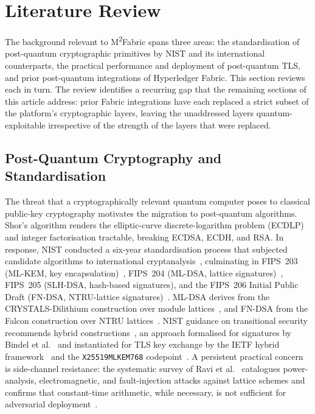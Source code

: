 \documentclass{ieeetj}
\newcommand{\mfabric}{M\textsuperscript{2}Fabric}
\begin{document}
\section{Literature Review} \label{sec:litreview}

The background relevant to \mfabric{} spans three areas: the standardisation
of post-quantum cryptographic primitives by NIST and its international
counterparts, the practical performance and deployment of post-quantum TLS,
and prior post-quantum integrations of Hyperledger Fabric. This section
reviews each in turn. The review identifies a recurring gap that the
remaining sections of this article address: prior Fabric integrations have
each replaced a strict subset of the platform's cryptographic layers,
leaving the unaddressed layers quantum-exploitable irrespective of the
strength of the layers that were replaced.

\subsection{Post-Quantum Cryptography and Standardisation}

The threat that a cryptographically relevant quantum computer poses to
classical public-key cryptography motivates the migration to post-quantum
algorithms. Shor's algorithm renders the elliptic-curve discrete-logarithm
problem (ECDLP) and integer factorisation tractable, breaking ECDSA, ECDH, and
RSA. In response, NIST conducted a six-year standardisation process that
subjected candidate algorithms to international
cryptanalysis~\cite{alagic2022nist}, culminating in FIPS~203 (ML-KEM, key
encapsulation)~\cite{nist_fips203}, FIPS~204 (ML-DSA, lattice
signatures)~\cite{nist_fips204}, FIPS~205 (SLH-DSA, hash-based signatures), and
the FIPS~206 Initial Public Draft (FN-DSA, NTRU-lattice
signatures)~\cite{nist_fips206}. ML-DSA derives from the CRYSTALS-Dilithium
construction over module lattices~\cite{ducas2018dilithium}, and FN-DSA from the
Falcon construction over NTRU lattices~\cite{pornin2019, prest2020falcon}. NIST
guidance on transitional security recommends hybrid
constructions~\cite{barker2020transition}, an approach formalised for signatures
by Bindel et al.~\cite{bindel2017} and instantiated for TLS key exchange by the
IETF hybrid framework~\cite{ietf_hybrid_tls} and the
\texttt{X25519MLKEM768} codepoint~\cite{ietf_x25519mlkem768}. A persistent
practical concern is side-channel resistance: the systematic survey of Ravi et
al.~\cite{ravi2024sidechannel} catalogues power-analysis, electromagnetic, and
fault-injection attacks against lattice schemes and confirms that constant-time
arithmetic, while necessary, is not sufficient for adversarial
deployment~\cite{pessl2019}.
\end{document}
